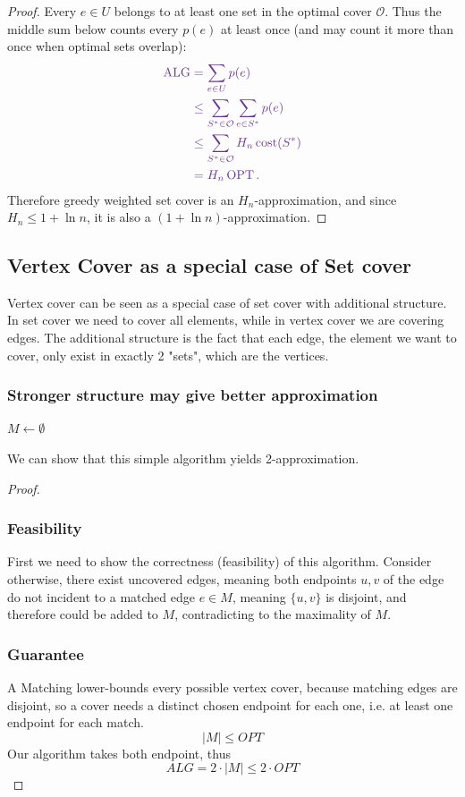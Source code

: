 \documentclass[10pt]{article}
\theoremstyle{definition}
\newcommand{\OPT}{\operatorname{OPT}}
\newcommand{\ALG}{\operatorname{ALG}}
\begin{document}
\begin{proof}
Every $e\in U$ belongs to at least one set in the optimal cover $\mathcal O$.
Thus the middle sum below counts every $p(e)$ at least once (and may count it
more than once when optimal sets overlap):
\[
  \color{bridgepurple}
  \begin{aligned}
  \ALG
  &=\sum_{e\in U}p(e)\\
  &\leq\sum_{S^*\in\mathcal O}\sum_{e\in S^*}p(e)\\
  &\leq\sum_{S^*\in\mathcal O}
      H_n\operatorname{cost}(S^*)\\
  &=H_n\OPT.
  \end{aligned}
\]
Therefore greedy weighted set cover is an $H_n$-approximation, and since
$H_n\leq1+\ln n$, it is also a $(1+\ln n)$-approximation.
\end{proof}


\subsection{Vertex Cover as a special case of Set cover}
Vertex cover can be seen as a special case of set cover with additional structure. In set cover we need to cover all elements, 
while in vertex cover we are covering edges. The additional structure is the fact that each edge, the element we want to cover, only exist in 
exactly 2 "sets", which are the vertices. 
\subsubsection*{Stronger structure may give better approximation}
\begin{algorithm}[H]
  $M \gets \emptyset$
  \;
\end{algorithm}
We can show that this simple algorithm yields 2-approximation. 
\begin{proof}
  \subsubsection*{Feasibility}
  First we need to show the correctness (feasibility) of this algorithm. Consider otherwise, 
  there exist uncovered edges, meaning both endpoints $u, v$ of the edge do not incident to a matched 
  edge $e \in M$, meaning $\{u, v\}$ is disjoint, and therefore could be added to $M$, contradicting to 
  the maximality of $M$. 
  \subsubsection*{Guarantee}
  A Matching lower-bounds every possible vertex cover, because matching edges are disjoint, so a cover needs 
  a distinct chosen endpoint for each one, i.e. at least one endpoint for each match.
  \[|M| \leq OPT\]
  Our algorithm takes both endpoint, thus 
  \[ALG = 2\cdot |M| \leq 2\cdot OPT\]
\end{proof}
\end{document}
